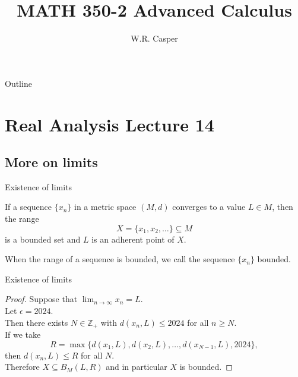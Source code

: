 \documentclass{beamer}
\title{MATH 350-2 Advanced Calculus}
\subtitle
{} %
\author[W.R. Casper] %
{W.R. Casper}
\institute[California State University Fullerton] %
{
  Department of Mathematics\\
  California State University Fullerton}
\begin{document}
\begin{frame}
  \titlepage
\end{frame}

\begin{frame}{Outline}
  \tableofcontents
\end{frame}



\section{Real Analysis Lecture 14}

\subsection{More on limits}

\begin{frame}{Existence of limits}
\begin{thm}
If a sequence $\{x_n\}$ in a metric space $(M,d)$ converges to a value $L\in M$, then the range
$$X = \{x_1,x_2,\dots\}\subseteq M$$
is a bounded set and $L$ is an adherent point of $X$.
\end{thm}
\pause
When the range of a sequence is bounded, we call the sequence $\{x_n\}$ bounded.
\end{frame}

\begin{frame}{Existence of limits}
\begin{proof}
Suppose that $\lim_{n\rightarrow\infty} x_n = L$.\\
\pause
Let $\epsilon = 2024$.\\
\pause
Then there exists $N\in\mathbb{Z}_+$ with $d(x_n,L)\leq 2024$ for all $n\geq N$.\\
\pause
If we take
$$R = \max\{d(x_1,L),d(x_2,L),\dots, d(x_{N-1},L),2024\},$$
\pause
then $d(x_n,L)\leq R$ for all $N$.\\
\pause
Therefore $X\subseteq B_M(L,R)$ and in particular $X$ is bounded.
\end{proof}
\end{frame}
\end{document}
